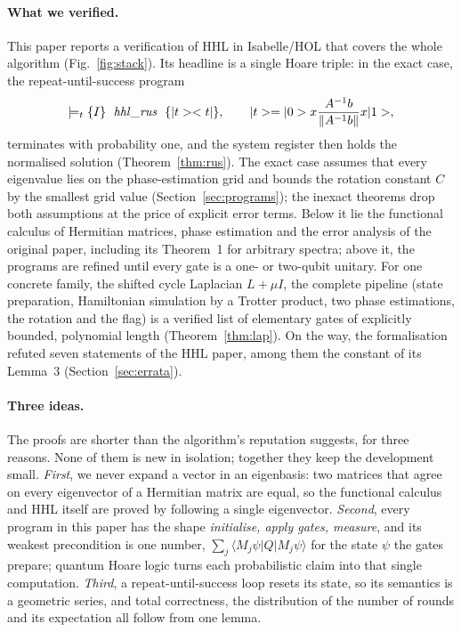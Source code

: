 \paragraph{What we verified.} This paper reports a verification of HHL in Isabelle/HOL that covers
the whole algorithm (Fig.~\ref{fig:stack}). Its headline is a single Hoare triple: in the exact
case, the repeat-until-success program
\[
\models_{t}\{I\}\;\ \mathit{hhl\_rus}\ \;\{|t>< t|\},\qquad |t>=|0>x\frac{A^{-1}b}{\|A^{-1}b\|}x|1>,
\]
terminates with probability one, and the system register then holds the normalised solution
(Theorem~\ref{thm:rus}). The exact case assumes that every eigenvalue lies on the phase-estimation grid
and bounds the rotation constant $C$ by the smallest grid value (Section~\ref{sec:programs}); the
inexact theorems drop both assumptions at the price of explicit error terms. Below it lie the functional calculus of Hermitian matrices, phase
estimation and the error analysis of the original paper, including its Theorem~1 for arbitrary
spectra; above it, the programs are refined until every gate is a one- or two-qubit unitary. For
one concrete family, the shifted cycle Laplacian $L+\mu I$, the complete pipeline (state
preparation, Hamiltonian simulation by a Trotter product, two phase estimations, the rotation and
the flag) is a verified list of elementary gates of explicitly bounded, polynomial length
(Theorem~\ref{thm:lap}). On the way, the formalisation refuted seven statements of the HHL paper,
among them the constant of its Lemma~3 (Section~\ref{sec:errata}).

\paragraph{Three ideas.} The proofs are shorter than the algorithm's reputation suggests, for three
reasons. None of them is new in isolation; together they keep the development small. \emph{First}, we never expand a vector in an eigenbasis: two matrices that agree on every
eigenvector of a Hermitian matrix are equal, so the functional calculus and HHL itself are proved by
following a single eigenvector. \emph{Second}, every program in this paper has the shape
\emph{initialise, apply gates, measure}, and its weakest precondition is one number,
$\sum_j\langle M_j\psi|Q|M_j\psi\rangle$ for the state $\psi$ the gates prepare; quantum Hoare logic turns each
probabilistic claim into that single computation. \emph{Third}, a repeat-until-success loop resets its
state, so its semantics is a geometric series, and total correctness, the distribution of the number of
rounds and its expectation all follow from one lemma.

